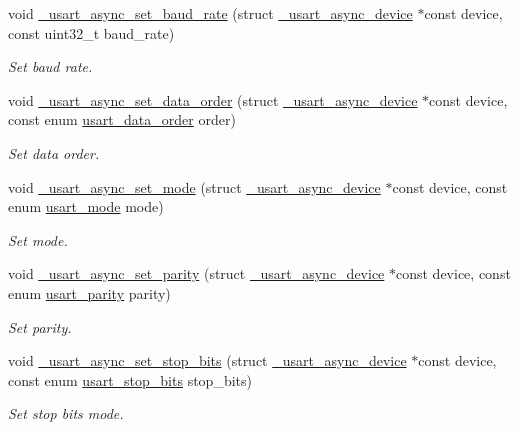 \begin{DoxyCompactItemize}
void \hyperlink{group___h_p_l_gab3211a57f9d6f2e355db5b67ce3fe905}{\+\_\+usart\+\_\+async\+\_\+set\+\_\+baud\+\_\+rate} (struct \hyperlink{struct__usart__async__device}{\+\_\+usart\+\_\+async\+\_\+device} $\ast$const device, const uint32\+\_\+t baud\+\_\+rate)
\begin{DoxyCompactList}\small\item\em Set baud rate. \end{DoxyCompactList}\item 
void \hyperlink{group___h_p_l_ga8f29c61bfbc9298ba0e25be2980ddd15}{\+\_\+usart\+\_\+async\+\_\+set\+\_\+data\+\_\+order} (struct \hyperlink{struct__usart__async__device}{\+\_\+usart\+\_\+async\+\_\+device} $\ast$const device, const enum \hyperlink{group___h_p_l_ga426849bbd9655cec091101ebc9123eb4}{usart\+\_\+data\+\_\+order} order)
\begin{DoxyCompactList}\small\item\em Set data order. \end{DoxyCompactList}\item 
void \hyperlink{group___h_p_l_ga90f1288d1ba0ab800801db3124f6a1cc}{\+\_\+usart\+\_\+async\+\_\+set\+\_\+mode} (struct \hyperlink{struct__usart__async__device}{\+\_\+usart\+\_\+async\+\_\+device} $\ast$const device, const enum \hyperlink{group___h_p_l_ga1c465965478e0f6908a4c99d4f3ad20f}{usart\+\_\+mode} mode)
\begin{DoxyCompactList}\small\item\em Set mode. \end{DoxyCompactList}\item 
void \hyperlink{group___h_p_l_ga739cdfde316390a089c38355bc4f596e}{\+\_\+usart\+\_\+async\+\_\+set\+\_\+parity} (struct \hyperlink{struct__usart__async__device}{\+\_\+usart\+\_\+async\+\_\+device} $\ast$const device, const enum \hyperlink{group___h_p_l_ga867cc5f0ea7d3bf651d68f0046cf6f41}{usart\+\_\+parity} parity)
\begin{DoxyCompactList}\small\item\em Set parity. \end{DoxyCompactList}\item 
void \hyperlink{group___h_p_l_ga7f2ef73e4b9da5be12fc0eabb97ab67b}{\+\_\+usart\+\_\+async\+\_\+set\+\_\+stop\+\_\+bits} (struct \hyperlink{struct__usart__async__device}{\+\_\+usart\+\_\+async\+\_\+device} $\ast$const device, const enum \hyperlink{group___h_p_l_ga88311517c5168c29a681604a8a33b06e}{usart\+\_\+stop\+\_\+bits} stop\+\_\+bits)
\begin{DoxyCompactList}\small\item\em Set stop bits mode. \end{DoxyCompactList}\item 

\end{DoxyCompactItemize}
